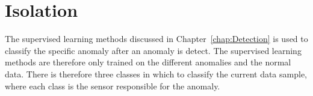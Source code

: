 \chapter{Isolation}
\label{chap:Isolation}
The supervised learning methods discussed in Chapter~\ref{chap:Detection} is used to classify the specific anomaly after an anomaly is detect. The supervised learning methods are therefore only trained on the different anomalies and the normal data. There is therefore three classes in which to classify the current data sample, where each class is the sensor responsible for the anomaly.

%	


%	

%	

%	

